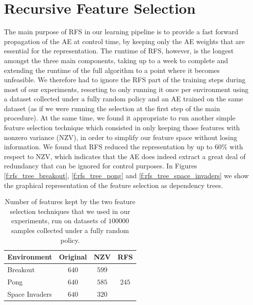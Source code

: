 \section{Recursive Feature Selection}
The main purpose of RFS in our learning pipeline is to provide a fast forward 
propagation of the AE at control time, by keeping only the AE weights that are 
essential for the representation. 
The runtime of RFS, however, is the longest amongst the three main components, 
taking up to a week to complete and extending the runtime of the full algorithm
to a point where it becomes unfeasible. We therefore had to ignore the RFS 
part of the training steps during most of our experiments, resorting to only
running it once per environment using a dataset collected under a fully random 
policy and an AE trained on the same dataset (as if we were running the 
selection at the first step of the main procedure). 
At the same time, we found it appropriate to run another simple feature 
selection technique which consisted in only keeping those features with nonzero 
variance (NZV), in order to simplify our feature space without losing 
information. 
We found that RFS reduced the representation by up to $60\%$ with respect to NZV,
which indicates that the AE does indeed extract a great deal of redundancy that
can be ignored for control purposes. 
In Figures \ref{f:rfs_tree_breakout}, \ref{f:rfs_tree_pong} and 
\ref{f:rfs_tree_space_invaders} we show the graphical representation of the 
feature selection as dependency trees.
%
\begin{table}
    \centering
    \begin{tabular}{l c c c} 
	\hline
	Environment    & Original & NZV   & RFS \\ 
	\hline 
	Breakout       & $640$    & $599$ & $ $ \\
	Pong           & $640$    & $585$ & $245$ \\
	Space Invaders & $640$    & $320$ & $ $ \\
	\hline
    \end{tabular}
    \caption[Feature selection results]{Number of features kept by the two 
	     feature selection techniques that we used in our experiments, run 
	     on datasets of $100000$ samples collected under a fully random 
	     policy.}
    \label{t:RFS_results}
\end{table}
%
%
